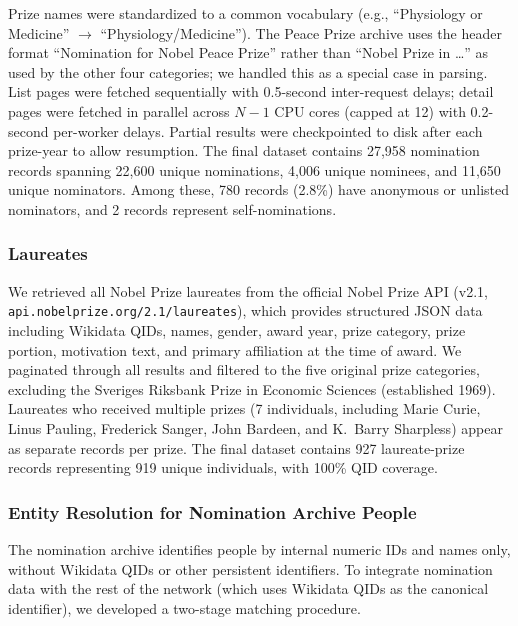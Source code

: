 \documentclass[11pt]{article}
\begin{document}
Prize names were standardized to a common vocabulary (e.g., ``Physiology or Medicine'' $\to$ ``Physiology/Medicine''). The Peace Prize archive uses the header format ``Nomination for Nobel Peace Prize'' rather than ``Nobel Prize in \ldots'' as used by the other four categories; we handled this as a special case in parsing. List pages were fetched sequentially with 0.5-second inter-request delays; detail pages were fetched in parallel across $N-1$ CPU cores (capped at 12) with 0.2-second per-worker delays. Partial results were checkpointed to disk after each prize-year to allow resumption. The final dataset contains 27{,}958 nomination records spanning 22{,}600 unique nominations, 4{,}006 unique nominees, and 11{,}650 unique nominators. Among these, 780 records (2.8\%) have anonymous or unlisted nominators, and 2 records represent self-nominations.

\subsubsection{Laureates}
\label{sec:data-laureates}

We retrieved all Nobel Prize laureates from the official Nobel Prize API (v2.1, \texttt{api.nobelprize.org/2.1/laureates}), which provides structured JSON data including Wikidata QIDs, names, gender, award year, prize category, prize portion, motivation text, and primary affiliation at the time of award. We paginated through all results and filtered to the five original prize categories, excluding the Sveriges Riksbank Prize in Economic Sciences (established 1969). Laureates who received multiple prizes (7 individuals, including Marie Curie, Linus Pauling, Frederick Sanger, John Bardeen, and K.~Barry Sharpless) appear as separate records per prize. The final dataset contains 927 laureate-prize records representing 919 unique individuals, with 100\% QID coverage.

\subsubsection{Entity Resolution for Nomination Archive People}
\label{sec:data-entity-resolution}

The nomination archive identifies people by internal numeric IDs and names only, without Wikidata QIDs or other persistent identifiers. To integrate nomination data with the rest of the network (which uses Wikidata QIDs as the canonical identifier), we developed a two-stage matching procedure.
\end{document}
